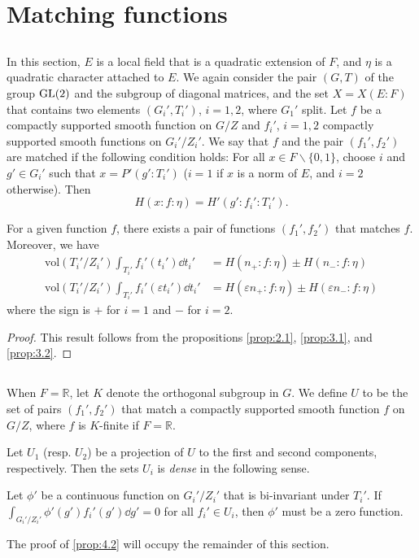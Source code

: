 \section{Matching functions}

\subsection{}
In this section, $E$ is a local field that is a quadratic extension of $F$, and $\eta$ is a quadratic character attached to $E$.
We again consider the pair $(G, T)$ of the group $\mathrm{GL}(2)$ and the subgroup of diagonal matrices, and the set $X = X(E:F)$ that contains two elements $(G_i', T_i')$, $i =1, 2$, where $G_1'$ split.
Let $f$ be a compactly supported smooth function on $G/Z$ and $f_i'$, $i=1, 2$ compactly supported smooth functions on $G_i' /Z_i'$.
We say that $f$ and the pair $(f_1', f_2')$ are matched if the following condition holds:
For all $x \in F \backslash \{0, 1\}$, choose $i$ and $g' \in G_i'$ such that $x = P'(g':T_i')$ ($i=1$ if $x$ is a norm of $E$, and $i=2$ otherwise).
Then
\[
H(x:f:\eta) = H'(g':f_i':T_i').
\]
\begin{proposition}\label{prop:4.1}
For a given function $f$, there exists a pair of functions $(f_1', f_2')$ that matches $f$.
Moreover, we have
\begin{align*}
    \mathrm{vol}(T_i' / Z_i') \int_{T_i'} f_i'(t_i') \dd t_i' &= H(n_+:f:\eta) \pm H(n_-:f:\eta) \\
    \mathrm{vol}(T_i' / Z_i') \int_{T_i'} f_i'(\varepsilon t_i') \dd t_i' &= H(\varepsilon n_+:f:\eta) \pm H(\varepsilon n_-:f:\eta)
\end{align*}
where the sign is $+$ for $i=1$ and $-$ for $i = 2$.
\end{proposition}
\begin{proof}
This result follows from the propositions \ref{prop:2.1}, \ref{prop:3.1}, and \ref{prop:3.2}.
\end{proof}

\subsection{}
When $F = \mathbb{R}$, let $K$ denote the orthogonal subgroup in $G$.
We define $U$ to be the set of pairs $(f_1', f_2')$ that match a compactly supported smooth function $f$ on $G/Z$, where $f$ is $K$-finite if $F = \mathbb{R}$.

Let $U_1$ (resp. $U_2$) be a projection of $U$ to the first and second components, respectively.
Then the sets $U_i$ is \emph{dense} in the following sense.
\begin{proposition}\label{prop:4.2}
    Let $\phi'$ be a continuous function on $G_i' / Z_i'$ that is bi-invariant under $T_i'$. 
    If $\int_{G_i' / Z_i'} \phi'(g') f_i'(g') \dd g' = 0$ for all $f_i' \in U_i$, then $\phi'$ must be a zero function.
\end{proposition}
The proof of \ref{prop:4.2} will occupy the remainder of this section.

